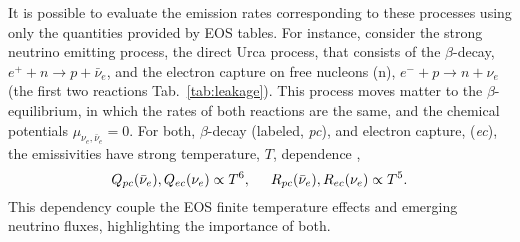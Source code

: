 It is possible to evaluate the emission rates corresponding to these processes 
using only the quantities provided by \ac{EOS} tables.
%
For instance, consider the strong neutrino emitting process, the direct Urca process, 
that consists of the $\beta$-decay, $e^+ + n \rightarrow p + \bar{\nu}_e$, 
and the electron capture on free nucleons (n), $e^{-} + p \rightarrow n + \nu_e$ 
(the first two reactions Tab.~\ref{tab:leakage}). 
This process moves matter to the $\beta$-equilibrium, in which the rates 
of both reactions are the same, and the chemical potentials $\mu_{\nu_e,\bar{\nu}_e}=0$.
%
For both, $\beta$-decay (labeled, \textit{pc}), and electron capture, 
(\textit{ec}), the emissivities 
have strong temperature, $T$, dependence \citep{Galeazzi:2013mia}, 
%
\begin{equation}
Q_{pc}(\bar{\nu}_e), Q_{ec}(\nu_e) \propto T^6, \hspace{5mm} R_{pc}(\bar{\nu}_e),R_{ec}(\nu_e)\propto T^5. \\
\end{equation}
%
This dependency couple the \ac{EOS} finite temperature effects and emerging neutrino fluxes,
highlighting the importance of both.
%
%


